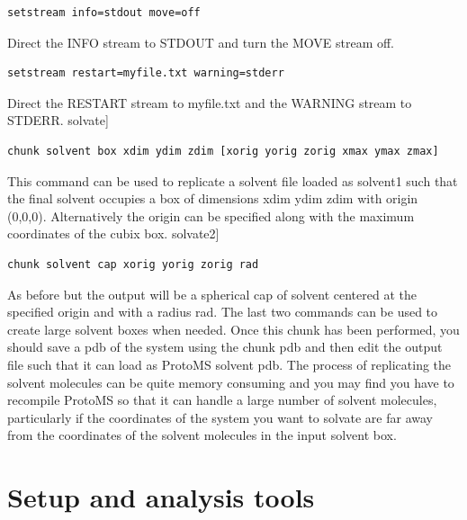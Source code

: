 \documentclass[letterpaper,10pt,english]{sphinxmanual}
\begin{document}
\begin{Verbatim}[commandchars=\\\{\}]
setstream info=stdout move=off
\end{Verbatim}

Direct the INFO stream to STDOUT and turn the MOVE stream off.

\begin{Verbatim}[commandchars=\\\{\}]
setstream restart=myfile.txt warning=stderr
\end{Verbatim}

Direct the RESTART stream to myfile.txt and the WARNING stream to STDERR. solvate{]}

\begin{Verbatim}[commandchars=\\\{\}]
chunk solvent box xdim ydim zdim [xorig yorig zorig xmax ymax zmax]
\end{Verbatim}

This command can be used to replicate a solvent file loaded as solvent1 such that the final solvent occupies a box of dimensions xdim ydim zdim with origin (0,0,0). Alternatively the origin can be specified along with the maximum coordinates of the cubix box. solvate2{]}

\begin{Verbatim}[commandchars=\\\{\}]
chunk solvent cap xorig yorig zorig rad
\end{Verbatim}

As before but the output will be a spherical cap of solvent centered at the specified origin and with a radius rad. The last two commands can be used to create large solvent boxes when needed. Once this chunk has been performed, you should save a pdb of the system using the chunk pdb and then edit the output file such that it can load as ProtoMS solvent pdb. The process of replicating the solvent molecules can be quite memory consuming and you may find you have to recompile ProtoMS so that it can handle a large number of solvent molecules, particularly if the coordinates of the system you want to solvate are far away from the coordinates of the solvent molecules in the input solvent box.


\section{Setup and analysis tools}
\label{protoms:setup-and-analysis-tools}
\end{document}
